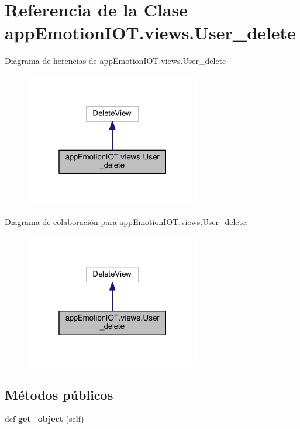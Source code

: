 \hypertarget{classappEmotionIOT_1_1views_1_1User__delete}{}\section{Referencia de la Clase app\+Emotion\+I\+O\+T.\+views.\+User\+\_\+delete}
\label{classappEmotionIOT_1_1views_1_1User__delete}


Diagrama de herencias de app\+Emotion\+I\+O\+T.\+views.\+User\+\_\+delete
\nopagebreak
\begin{figure}[H]
\begin{center}
\leavevmode
\includegraphics[width=217pt]{classappEmotionIOT_1_1views_1_1User__delete__inherit__graph}
\end{center}
\end{figure}


Diagrama de colaboración para app\+Emotion\+I\+O\+T.\+views.\+User\+\_\+delete\+:
\nopagebreak
\begin{figure}[H]
\begin{center}
\leavevmode
\includegraphics[width=217pt]{classappEmotionIOT_1_1views_1_1User__delete__coll__graph}
\end{center}
\end{figure}
\subsection*{Métodos públicos}
\begin{DoxyCompactItemize}
\item 
def {\bfseries get\+\_\+object} (self)\hypertarget{classappEmotionIOT_1_1views_1_1User__delete_aa89200cadf5a975f365a1e971861049f}{}\label{classappEmotionIOT_1_1views_1_1User__delete_aa89200cadf5a975f365a1e971861049f}

\end{DoxyCompactItemize}
